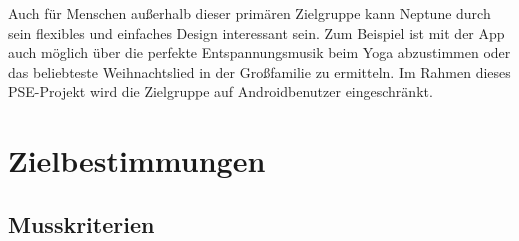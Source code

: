 \documentclass[oneside, ngerman]{sdqtechreport}
\begin{document}
Auch für Menschen außerhalb dieser primären Zielgruppe kann Neptune durch sein flexibles und einfaches Design interessant sein. Zum Beispiel ist mit der App auch möglich über die perfekte Entspannungsmusik beim Yoga abzustimmen oder das beliebteste Weihnachtslied in der Großfamilie zu ermitteln. 
Im Rahmen dieses PSE-Projekt wird die Zielgruppe auf Androidbenutzer eingeschränkt.

\chapter{Zielbestimmungen}
\label{chap:Zielbestimmungen}

\section{Musskriterien}
\label{sec:Zielbestimmungen:Musskriterien}
\end{document}
